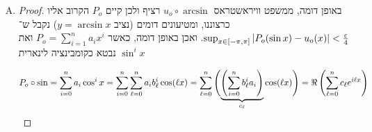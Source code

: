 \documentclass[]{../../../../tex/classes/homework}
\begin{document}
\begin{enumerate}[(A)]
\begin{proof}
			\[ \frac{\eg}{5} > \sof{P_e(x) - (u_e \circ \arccos)(x)} = \sof{P_e(\cos y) - u_e(\arccos \cos y)} = \sof{P_e(\cos y) - u_e(y)} \]
			לכן: (קבוצה חסומה ב־$\frac{\eg}{5}$, מותר לקחת סופרמום)
			\[ \sup_{y \in [-\pi, \pi]}\sof{P_e(\cos y) - u_e(y)} \le \frac{\eg}{5} < \frac{\eg}{4} \]
			עוד נבחין ש־$P_e(\cosx)$ פולינום טריגונומטרי. זאת כי $P_e = \sum_{i = 1}^{n}a_nx^{n}$ פולינום, וכן את $\cos^{i}x$ ניתן לבטא כ־$\sum_{\ml = 0}^{n} b^{i}_\ml \cos(\ml x)$. ואז נקבל ש־:
			\[ P_e \circ \cos = \sum_{i = 0}^{n}a_i\cos^{i}x = \sum_{i = 0}^{n}\sum_{\ml = 0}^{n}a_ib_\ml^{i}\cos(\ml x) = \sum_{\ml = 0}^{n}\Bigg({\underbrace{\cl{\sum_{i = 0}^{n}b_\ml^{i}a_i}}_{c_\ml}\cos(\ml x)}\Bigg)  = \Re\cl{\sum_{\ml = 0}^{n}c_\ml e^{i\ml x}}\]
			כנדרש. 
		\end{proof}
		\item \begin{proof}
			באופן דומה, ממשפט וויראשטראס $u_o \circ \arcsin$ רציף ולכן קיים $P_o$ הקרוב אליו כרצוננו, ומטיעונים דומים (נציב $y = \arcsin x$) נקבל ש־$\sup_{x \in [-\pi, \pi]}\sof{P_o(\sin x) - u_o(x)} < \frac{\eg}{4}$. ואכן באופן דומה, כאשר $P_o = \sum_{i = 1}^{n}a_ix^{i}$ ואת $\sin^{i}x$ נבטא כקומבינציה לינארית 
			
			\[ P_o \circ \sin = \sum_{i = 0}^{n}a_i\cos^{i}x = \sum_{i = 0}^{n}\sum_{\ell = 0}^{n}a_ib_\ell^{i}\cos(\ell x) = \sum_{\ell = 0}^{n}\Bigg({\underbrace{\left ( \sum_{i = 0}^{n}b_\ell^{i}a_i \right )}_{c_\ell}\cos(\ell x)}\Bigg)  = \Re\left ( \sum_{\ell = 0}^{n}c_\ell e^{i\ell x} \right ) \]
		\end{proof}
	\end{enumerate}
	
	
	\ndoc
\end{document}
